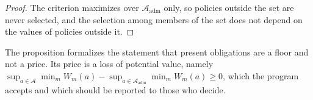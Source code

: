 \begin{proof}
The criterion maximizes over $\mathcal{A}_{\mathrm{adm}}$ only, so policies outside the set are never selected, and the selection among members of the set does not depend on the values of policies outside it.
\end{proof}

The proposition formalizes the statement that present obligations are a floor and not a price. Its price is a loss of potential value, namely $\sup_{a\in\mathcal{A}}\min_mW_m(a)-\sup_{a\in\mathcal{A}_{\mathrm{adm}}}\min_mW_m(a)\ge0$, which the program accepts and which should be reported to those who decide.
